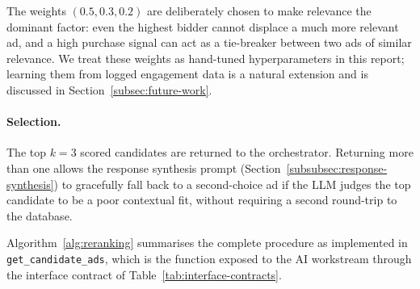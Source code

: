 The weights $(0.5, 0.3, 0.2)$ are deliberately chosen to make relevance the
dominant factor: even the highest bidder cannot displace a much more relevant
ad, and a high purchase signal can act as a tie-breaker between two ads of
similar relevance. We treat these weights as hand-tuned hyperparameters in
this report; learning them from logged engagement data is a natural
extension and is discussed in Section~\ref{subsec:future-work}.

\paragraph{Selection.} The top $k=3$ scored candidates are returned to the
orchestrator. Returning more than one allows the response synthesis prompt
(Section~\ref{subsubsec:response-synthesis}) to gracefully fall back to a
second-choice ad if the LLM judges the top candidate to be a poor
contextual fit, without requiring a second round-trip to the database.

Algorithm~\ref{alg:reranking} summarises the complete procedure as
implemented in \texttt{get\_candidate\_ads}, which is the function exposed to
the AI workstream through the interface contract of
Table~\ref{tab:interface-contracts}.


